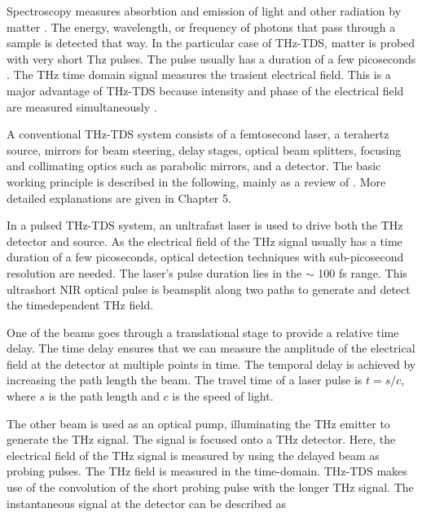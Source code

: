 Spectroscopy measures absorbtion and emission of light and other radiation by matter \cite{atascientificUnderstandingSpectrometrySpectroscopy2020}. The energy, wavelength, or frequency of photons that pass through a sample is detected that way. In the particular case of THz-TDS, matter is probed with very short Thz pulses.
The pulse usually has a duration of a few picoseconds \cite{neuTutorialIntroductionTerahertz2018}. The THz time domain signal measures the trasient electrical field. This is a major advantage of THz-TDS because intensity and phase of the electrical field are measured simultaneously \cite{zhaoPrincipleTerahertzTimeDomain2023}.

A conventional THz-TDS system consists of a femtosecond laser, a terahertz source, mirrors for beam steering, delay stages, optical beam splitters, focusing and collimating optics such as parabolic mirrors, and a detector. The basic working principle is described in the following, mainly as a review of \cite{neuTutorialIntroductionTerahertz2018,PrinciplesTerahertzScience2009,nandiErAsInAlGaAsPhotoconductors2021}. More detailed explanations are given in Chapter 5.


In a pulsed THz-TDS system, an unltrafast laser is used to drive both the THz detector and source. As the electrical field of the THz signal usually has a time duration of a few picoseconds, optical detection techniques with sub-picosecond resolution are needed. The laser's pulse duration lies in the $\sim$ \num{100} \si{\femto\s} range. This ultrashort NIR optical pulse is beamsplit along two paths to generate and detect the timedependent THz field. 

One of the beams goes through a translational stage to provide a relative time delay. The time delay ensures that we can measure the amplitude of the electrical field at the detector at multiple points in time. The temporal delay is achieved by increasing the path length the beam. The travel time of a laser pulse is $t = s/c$, where $s$ is the path length and $c$ is the speed of light. 

The other beam is used as an optical pump, illuminating the THz emitter to generate the THz signal. The signal is focused onto a THz detector. Here, the electrical field of the THz signal is measured by using the delayed beam as probing pulses. The THz field is measured in the time-domain. THz-TDS makes use of the convolution of the short probing pulse with the longer THz signal. The instantaneous signal at the detector can be described as 

